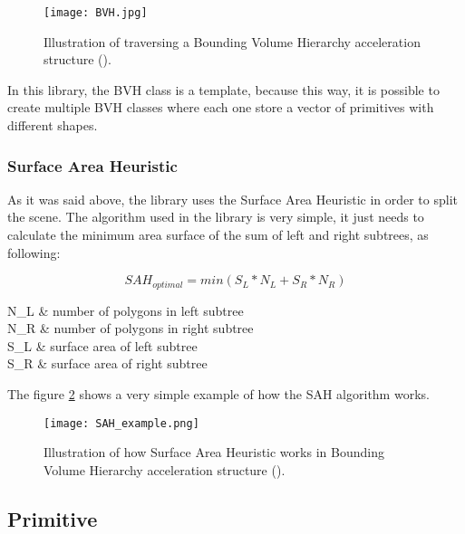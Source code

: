 \begin{figure}[H]
	\centering
	\caption{Illustration of traversing a Bounding Volume Hierarchy acceleration structure (\cite{BVH}).}
	\label{BVH.}
	\texttt{[image: BVH.jpg]}
\end{figure}

\par
In this library, the BVH class is a template, because this way, it is possible to create multiple BVH classes where each one store a vector of primitives with different shapes.

\subsubsection{Surface Area Heuristic}

\par
As it was said above, the library uses the Surface Area Heuristic in order to split the scene.
The algorithm used in the library is very simple, it just needs to calculate the minimum area surface of the sum of left and right subtrees, as following:

\begin{equation}
SAH_{optimal} = min(S_L * N_L + S_R * N_R)
\end{equation}

\begin{conditions}
	N_L & number of polygons in left subtree \\
	N_R & number of polygons in right subtree \\
	S_L & surface area of left subtree \\
	S_R & surface area of right subtree \\
\end{conditions}

\par
The figure \ref{SAH.} shows a very simple example of how the SAH algorithm works.

\begin{figure}[H]
	\centering
	\caption{Illustration of how Surface Area Heuristic works in Bounding Volume Hierarchy acceleration structure (\cite{SAH}).}
	\label{SAH.}
	\texttt{[image: SAH\_example.png]}
\end{figure}

\subsection{Primitive}

